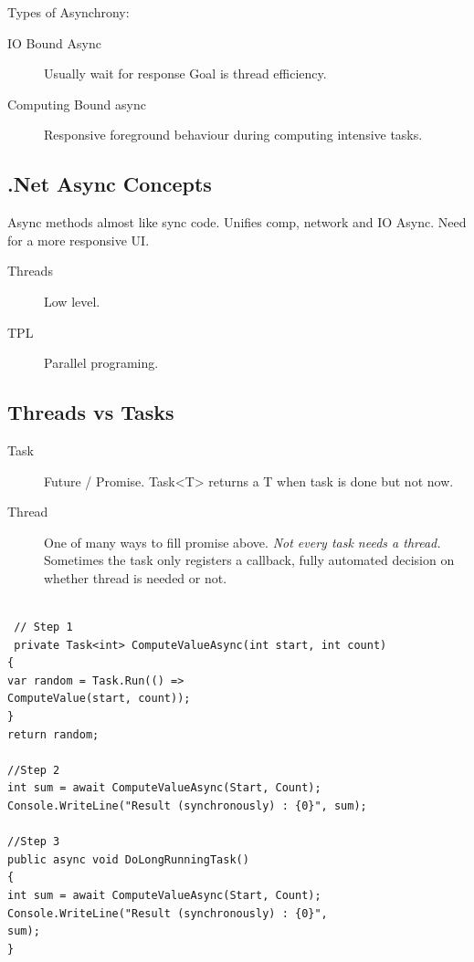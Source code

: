 \documentclass[a4paper,10pt]{scrartcl}
\begin{document}
Types of Asynchrony:
\begin{description}
 \item [IO Bound Async] Usually wait for response Goal is thread efficiency.
 \item [Computing Bound async] Responsive foreground behaviour during computing intensive tasks.
\end{description}

\subsection{.Net Async Concepts}

Async methods almost like sync code. Unifies comp, network and IO Async. Need for a more responsive UI.
\begin{description}
 \item [Threads] Low level. 
 \item [TPL] Parallel programing.
\end{description}

\subsection{Threads vs Tasks}
\begin{description}
 \item [Task] Future / Promise. Task<T> returns a T when task is done but not now.
 \item [Thread] One of many ways to fill promise above. \textit{Not every task needs a thread.} Sometimes the task only registers a callback, fully automated decision on whether thread is needed or not. 
 
\end{description}

\begin{lstlisting}[caption="task example"]
 
 // Step 1
 private Task<int> ComputeValueAsync(int start, int count)
{
var random = Task.Run(() =>
ComputeValue(start, count));
}
return random;

//Step 2 
int sum = await ComputeValueAsync(Start, Count);
Console.WriteLine("Result (synchronously) : {0}", sum);

//Step 3 
public async void DoLongRunningTask()
{
int sum = await ComputeValueAsync(Start, Count);
Console.WriteLine("Result (synchronously) : {0}",
sum);
}

\end{lstlisting}
\end{document}
